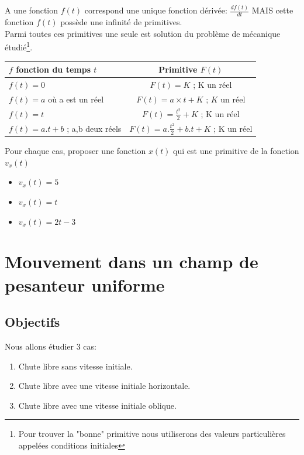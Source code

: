 
A une fonction $f(t)$ correspond une unique fonction dérivée: $\frac{df(t)}{dt}$ MAIS cette fonction $f(t)$ possède une infinité de primitives. \\ Parmi toutes ces primitives une seule est solution du problème de mécanique étudié\footnote{Pour trouver la "bonne" primitive nous utiliserons des valeurs particulières appelées conditions initiales}.


\begin{tabular}{l|c}
  $f$ fonction du temps $t$ &Primitive $F(t)$ \\
  \hline \hline 
  $f(t) = 0$ & $F(t)=K$ ; K un réel\\
  \hline
  $f(t) = a$ où a est un réel& $F(t)= a\times t + K$ ; $K$  un réel  \\
  \hline
$f(t)= t$ & $F(t)= \frac{t^2}{2}+ K$ ; K  un réel\\
\hline
$f(t) = a .t + b$ ; a,b deux réels & $F(t)=a.\frac{t^2}{2}+b.t+K$ ; K un réel\\
\hline
\end{tabular}

Pour chaque cas, proposer une fonction $x(t)$ qui est une primitive de la fonction $v_x(t)$
\begin{itemize}
	\item $v_x(t) = 5$
	\item $v_x(t)= t$
	\item $v_x(t) = 2t-3$
\end{itemize}


\section{Mouvement dans un champ de pesanteur uniforme}
\subsection{Objectifs}
Nous allons étudier 3 cas: 
\begin{enumerate}
	\item Chute libre sans vitesse initiale.
	\item Chute libre avec une vitesse initiale horizontale.
	\item Chute libre avec une vitesse initiale oblique.
\end{enumerate}

